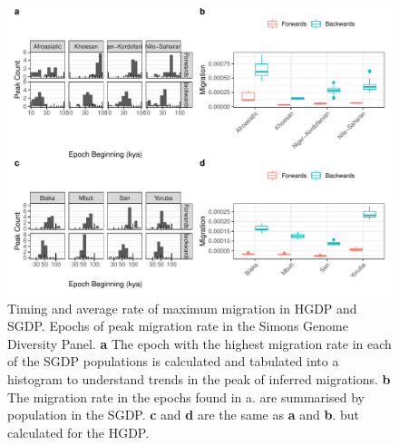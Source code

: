 \documentclass{article}
\begin{document}

\begin{figure}
    \centering
    \includegraphics[width=\textwidth]{plot/peaks.pdf}
    \caption{Timing and average rate of maximum migration in HGDP and SGDP. Epochs of peak migration rate in the Simons Genome Diversity Panel. {\bf a} The epoch with the highest migration rate in each of the SGDP populations is calculated and tabulated into a histogram to understand trends in the peak of inferred migrations. {\bf b} The migration rate in the epochs found in a. are summarised by population in the SGDP. {\bf c} and {\bf d} are the same as {\bf a} and {\bf b}. but calculated for the HGDP.}
    \label{fig:peaks}
\end{figure}
\end{document}
